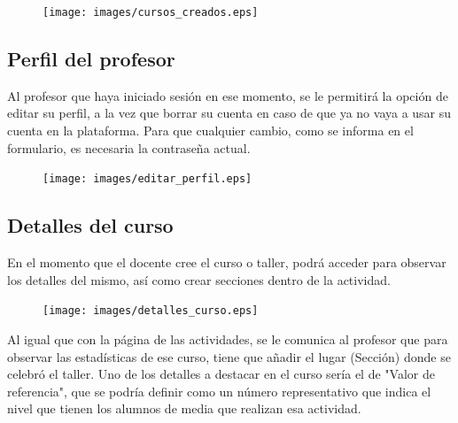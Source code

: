 \begin{figure}[!th]
\begin{center}
\texttt{[image: images/cursos\_creados.eps]}
\label{fig:14}
\end{center}
\end{figure}


\subsection{Perfil del profesor}
\label{1:sec:4}

Al profesor que haya iniciado sesión en ese momento, se le permitirá la opción de editar su perfil, a la vez que borrar su cuenta en caso de que ya no vaya a usar su cuenta en la plataforma.
Para que cualquier cambio, como se informa en el formulario, es necesaria la contraseña actual.

\begin{figure}[!th]
\begin{center}
\texttt{[image: images/editar\_perfil.eps]}
\label{fig:15}
\end{center}
\end{figure}


\subsection{Detalles del curso}
\label{1:sec:5}

En el momento que el docente cree el curso o taller, podrá acceder para observar los detalles del mismo, así como crear secciones dentro de la actividad.

\begin{figure}[!th]
\begin{center}
\texttt{[image: images/detalles\_curso.eps]}
\label{fig:16}
\end{center}
\end{figure}

Al igual que con la página de las actividades, se le comunica al profesor que para observar las estadísticas de ese curso, tiene que añadir el lugar (Sección) donde se celebró el taller.
Uno de los detalles a destacar en el curso sería el de "Valor de referencia", que se podría definir como un número representativo que indica el nivel que tienen los alumnos de media que realizan
esa actividad.


